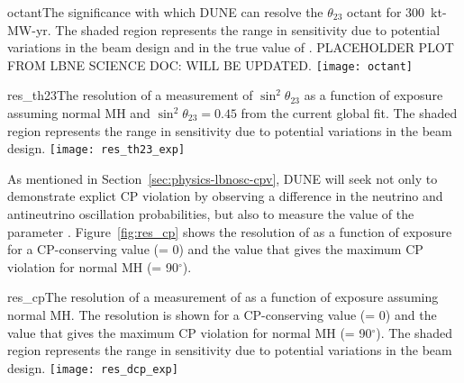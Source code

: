 \begin{cdrfigure}{octant}{The significance with which DUNE can resolve the $\theta_{23}$ octant for 300~kt-MW-yr. The shaded region represents the range in sensitivity due to potential variations in the beam design and in the true value of \deltacp. PLACEHOLDER PLOT FROM LBNE SCIENCE DOC: WILL BE UPDATED.}
 \texttt{[image: octant]}
\end{cdrfigure}

\begin{cdrfigure}{res_th23}{The resolution of a measurement of $\sin^2\theta_{23}$ as a function of exposure assuming normal MH and $\sin^2\theta_{23} = 0.45$ from the current global fit. The shaded region represents the range in sensitivity due to potential variations in the beam design.  }
 \texttt{[image: res\_th23\_exp]}
\end{cdrfigure}


As mentioned in Section~\ref{sec:physics-lbnosc-cpv}, DUNE will seek not only to demonstrate explict CP violation by observing a difference in the neutrino and antineutrino oscillation probabilities, but also to measure the value of the parameter \deltacp.  Figure~\ref{fig:res_cp} shows the resolution of \deltacp as a function of exposure for a CP-conserving value (\deltacp = 0) and the value that gives the maximum CP violation for normal MH (\deltacp = 90\mbox{$^{\circ}$}).

\begin{cdrfigure}{res_cp}{The resolution of a measurement of \deltacp as a function of exposure assuming normal MH.  The resolution is shown for a CP-conserving value (\deltacp = 0) and the value that gives the maximum CP violation for normal MH (\deltacp = 90\mbox{$^{\circ}$}). The shaded region represents the range in sensitivity due to potential variations in the beam design.  }
 \texttt{[image: res\_dcp\_exp]}
\end{cdrfigure}

